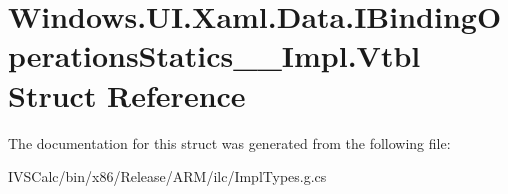 \hypertarget{struct_windows_1_1_u_i_1_1_xaml_1_1_data_1_1_i_binding_operations_statics_____impl_1_1_vtbl}{}\section{Windows.\+U\+I.\+Xaml.\+Data.\+I\+Binding\+Operations\+Statics\+\_\+\+\_\+\+Impl.\+Vtbl Struct Reference}
\label{struct_windows_1_1_u_i_1_1_xaml_1_1_data_1_1_i_binding_operations_statics_____impl_1_1_vtbl}


The documentation for this struct was generated from the following file\+:\begin{DoxyCompactItemize}
\item 
I\+V\+S\+Calc/bin/x86/\+Release/\+A\+R\+M/ilc/Impl\+Types.\+g.\+cs\end{DoxyCompactItemize}
